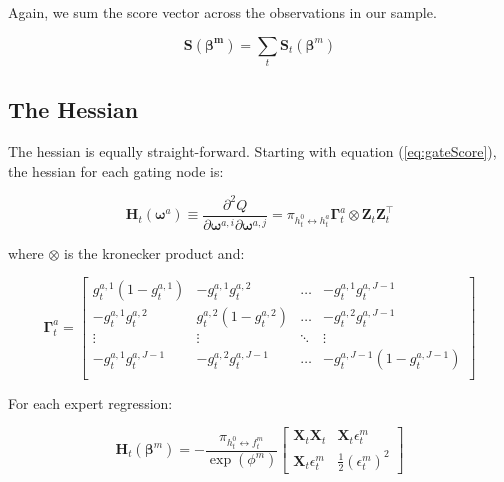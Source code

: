 \documentclass[12pt]{article}
\newcommand{\bw}[1]{\boldsymbol{\omega}^{#1}}
\newcommand{\Ht}[1]{\mathbf{H}_{t}(#1)}
\newcommand{\gateprod}[2]{\pi_{#1 \longleftrightarrow #2}}
\begin{document}
Again, we sum the score vector across the observations in our sample. 

\begin{equation}
  \boldsymbol{S}(\boldsymbol{\beta^{m}}) = \sum_{t} \boldsymbol{S}_{t}(\boldsymbol{\beta}^{m})
\end{equation}

\bigskip



\subsection{The Hessian}

The hessian is equally straight-forward. Starting with equation
(\ref{eq:gateScore}), the hessian for each gating node is:


\begin{equation} \label{eq:nodehessian}
  \Ht{\bw{a}} \equiv \frac{\partial^{2} Q}{\partial \boldsymbol{\omega}^{a,i} \partial \boldsymbol{\omega}^{a,j}} = \gateprod{h^{0}_{t}}{h^{a}_{t}} \boldsymbol{\Gamma}^{a}_{t} \otimes  \boldsymbol{Z}_{t} \boldsymbol{Z}_{t}^\top
\end{equation}

where $\otimes$ is the kronecker product and:

\begin{equation}
  \boldsymbol{\Gamma}^{a}_{t} = \begin{bmatrix}
  g_{t}^{a,1}(1-g_{t}^{a,1}) & -g_{t}^{a,1}g_{t}^{a,2}    & \dots  & -g_{t}^{a,1}g_{t}^{a,J-1}       \\
  -g_{t}^{a,1}g_{t}^{a,2}    & g_{t}^{a,2}(1-g_{t}^{a,2}) & \dots  & -g_{t}^{a,2}g_{t}^{a,J-1}       \\
  \vdots                     &  \vdots                    & \ddots & \vdots                 \\
  -g_{t}^{a,1}g_{t}^{a,J-1}  & -g_{t}^{a,2}g_{t}^{a,J-1}  & \dots  & -g_{t}^{a,J-1}(1-g_{t}^{a,J-1}) \\
    \end{bmatrix}
\end{equation}

For each expert regression:


\begin{equation}
  \Ht{\boldsymbol{\beta}^{m}} = - \frac{\gateprod{h^{0}_{t}}{f^{m}_{t}}}{\exp{(\phi^{m})}} \begin{bmatrix}
  \boldsymbol{X}_{t} \boldsymbol{X}_{t}     &  \boldsymbol{X}_{t} \epsilon^{m}_{t}     \\
  \boldsymbol{X}_{t} \epsilon^{m}_{t}       &  \frac{1}{2} (\epsilon^{m}_{t})^{2}
    \end{bmatrix}
\end{equation}
\end{document}
